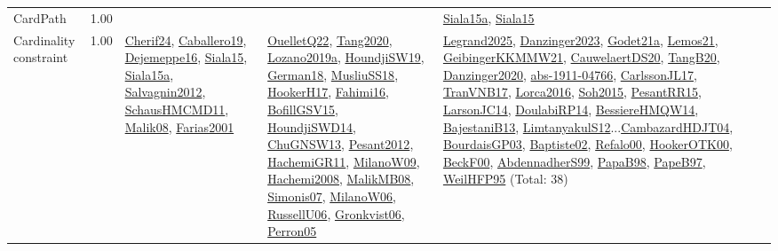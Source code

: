 {\begin{longtable}{p{3cm}r>{\raggedright\arraybackslash}p{6cm}>{\raggedright\arraybackslash}p{6cm}>{\raggedright\arraybackslash}p{8cm}}
\index{CardPath}\index{Constraints!CardPath}CardPath &  1.00 &  &  & \hyperref[detail:Siala15a]{Siala15a}, \hyperref[detail:Siala15]{Siala15}\\
\index{Cardinality constraint}\index{Constraints!Cardinality constraint}Cardinality constraint &  1.00 & \hyperref[detail:Cherif24]{Cherif24}, \hyperref[detail:Caballero19]{Caballero19}, \hyperref[detail:Dejemeppe16]{Dejemeppe16}, \hyperref[detail:Siala15]{Siala15}, \hyperref[detail:Siala15a]{Siala15a}, \hyperref[detail:Salvagnin2012]{Salvagnin2012}, \hyperref[detail:SchausHMCMD11]{SchausHMCMD11}, \hyperref[detail:Malik08]{Malik08}, \hyperref[detail:Farias2001]{Farias2001} & \hyperref[detail:OuelletQ22]{OuelletQ22}, \hyperref[detail:Tang2020]{Tang2020}, \hyperref[detail:Lozano2019a]{Lozano2019a}, \hyperref[detail:HoundjiSW19]{HoundjiSW19}, \hyperref[detail:German18]{German18}, \hyperref[detail:MusliuSS18]{MusliuSS18}, \hyperref[detail:HookerH17]{HookerH17}, \hyperref[detail:Fahimi16]{Fahimi16}, \hyperref[detail:BofillGSV15]{BofillGSV15}, \hyperref[detail:HoundjiSWD14]{HoundjiSWD14}, \hyperref[detail:ChuGNSW13]{ChuGNSW13}, \hyperref[detail:Pesant2012]{Pesant2012}, \hyperref[detail:HachemiGR11]{HachemiGR11}, \hyperref[detail:MilanoW09]{MilanoW09}, \hyperref[detail:Hachemi2008]{Hachemi2008}, \hyperref[detail:MalikMB08]{MalikMB08}, \hyperref[detail:Simonis07]{Simonis07}, \hyperref[detail:MilanoW06]{MilanoW06}, \hyperref[detail:RussellU06]{RussellU06}, \hyperref[detail:Gronkvist06]{Gronkvist06}, \hyperref[detail:Perron05]{Perron05} & \hyperref[detail:Legrand2025]{Legrand2025}, \hyperref[detail:Danzinger2023]{Danzinger2023}, \hyperref[detail:Godet21a]{Godet21a}, \hyperref[detail:Lemos21]{Lemos21}, \hyperref[detail:GeibingerKKMMW21]{GeibingerKKMMW21}, \hyperref[detail:CauwelaertDS20]{CauwelaertDS20}, \hyperref[detail:TangB20]{TangB20}, \hyperref[detail:Danzinger2020]{Danzinger2020}, \hyperref[detail:abs-1911-04766]{abs-1911-04766}, \hyperref[detail:CarlssonJL17]{CarlssonJL17}, \hyperref[detail:TranVNB17]{TranVNB17}, \hyperref[detail:Lorca2016]{Lorca2016}, \hyperref[detail:Soh2015]{Soh2015}, \hyperref[detail:PesantRR15]{PesantRR15}, \hyperref[detail:LarsonJC14]{LarsonJC14}, \hyperref[detail:DoulabiRP14]{DoulabiRP14}, \hyperref[detail:BessiereHMQW14]{BessiereHMQW14}, \hyperref[detail:BajestaniB13]{BajestaniB13}, \hyperref[detail:LimtanyakulS12]{LimtanyakulS12}...\hyperref[detail:CambazardHDJT04]{CambazardHDJT04}, \hyperref[detail:BourdaisGP03]{BourdaisGP03}, \hyperref[detail:Baptiste02]{Baptiste02}, \hyperref[detail:Refalo00]{Refalo00}, \hyperref[detail:HookerOTK00]{HookerOTK00}, \hyperref[detail:BeckF00]{BeckF00}, \hyperref[detail:AbdennadherS99]{AbdennadherS99}, \hyperref[detail:PapaB98]{PapaB98}, \hyperref[detail:PapeB97]{PapeB97}, \hyperref[detail:WeilHFP95]{WeilHFP95} (Total: 38)\\

\end{longtable}}
